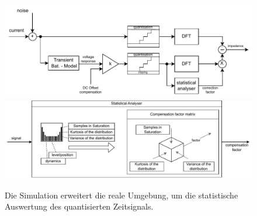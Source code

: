 \begin{figure}[h!] 
	\centering 
	\includegraphics[width=1\columnwidth]{../img/histo_sim.pdf}
	\includegraphics[width=1\columnwidth]{../img/stat_analyser.pdf}
	\caption{Die Simulation erweitert die reale Umgebung, um die statistische Auswertung des quantisierten Zeitsignals.}
	\label{fig:Simulation}
\end{figure} 

